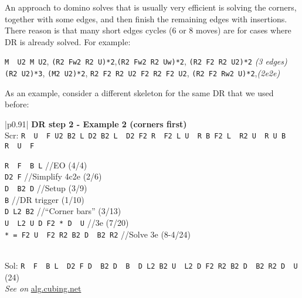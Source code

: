 \documentclass[11pt,a4paper]{book}
\newcommand{\p}{\textquotesingle}
\newcommand{\m}{\texttt}
\newcommand{\ps}{\p\,\,}
\newcommand{\comment}[1]{{\color{gray}\quad//#1}}
\begin{document}
An approach to domino solves that is usually very efficient is solving the corners, together with some edges, and then finish the remaining edges with insertions. There reason is that many short edges cycles ($6$ or $8$ moves) are for cases where DR is already solved. For example:
\begin{center}
\m{M\ps U2 M U2}, \quad\m{(R2 Fw2 R2 U)*2},\quad\m{(R2 Fw2 R2 Uw)*2}, \quad \m{(R2 F2 R2 U2)*2} \qquad \emph{(3 edges)}\\
\m{(R2 U2)*3}, \quad \m{(M2 U2)*2}, \quad \m{R2 F2 R2 U2 F2 R2 F2 U2}, \quad \m{(R2 F2 Rw2 U)*2},\qquad \emph{(2e2e)}
\end{center}

As an example, consider a different skeleton for the same DR that we used before:

\bigskip
\begin{tabular}{|p{}|}
\hline
\textbf{DR step 2 - Example 2 (corners first)}\\
\hline
Scr: \m{R\ps U\ps F  U2 B2 L  D2 B2 L\ps D2 F2 R\ps F2 L  U\ps R B  F2 L\ps R2 U\ps R  U  B R\ps U\ps F}\\
\hline
\begin{minipage}[l]{0.650\textwidth}
\m{R\ps F\ps B L\p} \comment{EO (4/4)}\\
\m{D2 F} \comment{Simplify 4c2e (2/6)}\\
\m{D\ps B2 D\p} \comment{Setup (3/9)}\\
\m{B\p} \comment{DR trigger (1/10)}\\
\m{D L2 B2} \comment{``Corner bars'' (3/13)}\\
\m{U\ps L2 U D F2 * D\ps U} \comment{3e (7/20)}\\
\m{* = F2 U\ps F2 R2 B2 D\ps B2 R2} \comment{Solve 3e (8-4/24)}
\end{minipage}
\begin{minipage}[c]{0.25\textwidth}

\end{minipage}\\
\hline
Sol: \m{R\ps F\ps B L\ps D2 F D\ps B2 D\ps B\ps D L2 B2 U\ps L2 D F2 R2 B2 D\ps B2 R2 D\ps U} (24)\\
\hline
\emph{See on }\href{https://alg.cubing.net/?alg=R-_F-_B_L-_\%2F\%2FEO_(4\%2F4)\%0AD2_F_\%2F\%2FSimplify_(2\%2F6)\%0AD-_B2_D-_B-_\%2F\%2FDR_(4\%2F10)\%0AD_L2_B2_\%2F\%2FCorner_bars_(3\%2F13)\%0AU-_L2_U_D_F2_D-_U_\%2F\%2F3e_(7\%2F20)&setup=R-_U-_F__U2_B2_L__D2_B2_L-_D2_F2_R-_F2_L__U-_R__B__F2_L-_R2_U-_R__U__B__R-_U-_F}{alg.cubing.net}\\
\hline
\end{tabular}
\bigskip
\end{document}
